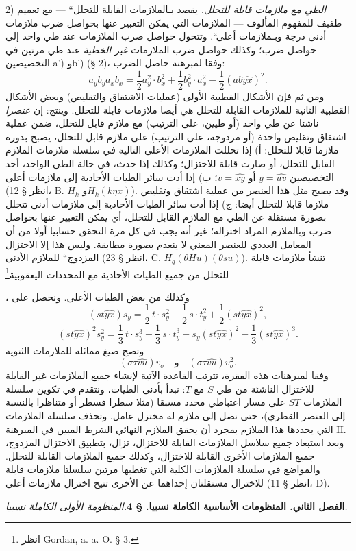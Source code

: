 \documentclass[11pt]{article}
\providecommand{\glqq}{\textquotedblbase}
\providecommand{\grqq}{\textquotedblleft}
\newcommand{\srcLTR}[1]{\relax\ifmmode\text{\mbox{\babelsublr{\foreignlanguage{english}{#1}}}}\else\babelsublr{\foreignlanguage{english}{#1}}\fi}
\newcommand{\srcfn}[2]{\begingroup\renewcommand{\thefootnote}{\srcLTR{#1}}\footnote{#2}\addtocounter{footnote}{-1}\endgroup}
\begin{document}
2) \emph{الطي مع ملازمات قابلة للتحلل.}
يقصد بـ\glqq{}الملازمات القابلة للتحلل\grqq{} --- مع تعميم طفيف للمفهوم المألوف --- الملازمات التي يمكن التعبير عنها بحواصل ضرب ملازمات أدنى درجة وبـ\glqq{}ملازمات أعلى\grqq{}. وتتحول حواصل ضرب الملازمات عند طي واحد إلى حواصل ضرب؛ وكذلك حواصل ضرب الملازمات \emph{غير الخطية} عند طي مرتين في التخصيصين a') وb') (§ 2)، وفقا لمبرهنة حاصل الضرب:
\[
a_yb_y a_xb_x=\frac12a_y^2\cdot b_x^2+\frac12b_y^2\cdot a_x^2-\frac12(ab\widehat{yx})^2.
\]
ومن ثم فإن الأشكال القطبية الأولى (عمليات الاشتقاق والتقليص) وبعض الأشكال القطبية الثانية للملازمات القابلة للتحلل هي أيضا ملازمات قابلة للتحلل. وينتج:
إن \emph{عنصرا} ناشئا عن طي واحد (أو طيين، على الترتيب) مع ملازم قابل للتحلل، ضمن عملية اشتقاق وتقليص واحدة (أو مزدوجة، على الترتيب) على ملازم قابل للتحلل، يصبح بدوره ملازما قابلا للتحلل:
أ) إذا تحللت الملازمات الأعلى التالية في سلسلة ملازمات الملازم القابل للتحلل، أو صارت قابلة للاختزال؛ وكذلك إذا حدث، في حالة الطي الواحد، أحد التخصيصين $y=\widehat{uv}$ أو $v=\widehat{xy}$؛
ب) إذا أدت سائر الطيات الأحادية إلى ملازمات أعلى (انظر § 12، B. $H_k$ و$H_k(k\eta x)$).
وقد يصبح مثل هذا العنصر من عملية اشتقاق وتقليص ملازما قابلا للتحلل أيضا:
ج) إذا أدت سائر الطيات الأحادية إلى ملازمات أدنى تتحلل بصورة مستقلة عن الطي مع الملازم القابل للتحلل، أي يمكن التعبير عنها بحواصل ضرب وبالملازم المراد اختزاله؛ غير أنه يجب في كل مرة التحقق حسابيا أولا من أن المعامل العددي للعنصر المعني لا ينعدم بصورة مطابقة. وليس هذا إلا \glqq{}الاختزال المزدوج\grqq{} للملازم الأدنى (انظر § 23، C. $H_q(\theta H u)(\theta s u)$).
تنشأ ملازمات قابلة للتحلل من جميع الطيات الأحادية مع المحددات اليعقوبية\srcfn{*)}{انظر Gordan, a. a. O. § 3.}، وكذلك من بعض الطيات الأعلى. ونحصل على
\[
(st\widehat{yx})s_y=\frac12\,t\cdot s_y^2-\frac12\,s\cdot t_y^2+\frac12(st\widehat{yx})^2,
\]
\[
(st\widehat{yx})^2s_y^2=\frac13\,t\cdot s_y^3-\frac13\,s\cdot t_y^3+s_y(st\widehat{yx})^2-\frac13(st\widehat{yx})^3.
\]
وتصح صيغ مماثلة للملازمات الثنوية
\[
(\sigma\tau\widehat{vu})v_\sigma
\quad\text{و}\quad
(\sigma\tau\widehat{vu})v_\sigma^2.
\]
وفقا لمبرهنات هذه الفقرة، تترتب القاعدة الآتية لإنشاء جميع الملازمات غير القابلة للاختزال الناشئة من طي $S$ مع $T$:
نبدأ بأدنى الطيات، ونتقدم في تكوين سلسلة الملازمات $ST$ على مسار اعتباطي محدد مسبقا (مثلا سطرا فسطر أو متناظرا بالنسبة إلى العنصر القطري)، حتى نصل إلى ملازم له مختزل عامل. وتحذف سلسلة الملازمات التي يحددها هذا الملازم بمجرد أن يحقق الملازم النهائي الشرط المبين في المبرهنة II. وبعد استبعاد جميع سلاسل الملازمات القابلة للاختزال، تزال، بتطبيق الاختزال المزدوج، جميع الملازمات الأخرى القابلة للاختزال، وكذلك جميع الملازمات القابلة للتحلل. والمواضع في سلسلة الملازمات الكلية التي تغطيها مرتين سلسلتا ملازمات قابلة للاختزال مستقلتان إحداهما عن الأخرى تتيح اختزال ملازمات أعلى (انظر § 11، D).
\begin{center}
\textbf{الفصل الثاني. \quad المنظومات الأساسية الكاملة نسبيا.}
\textbf{§ 4.}\quad\emph{المنظومة الأولى الكاملة نسبيا.}
\end{center}
\end{document}
